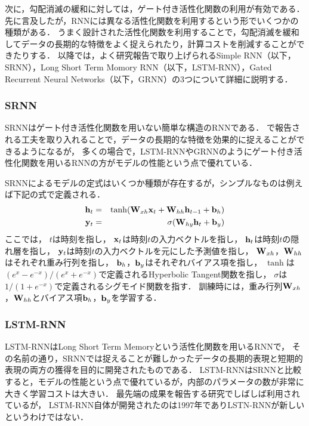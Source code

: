 次に，勾配消滅の緩和に対しては，ゲート付き活性化関数の利用が有効である．
先に言及したが，RNNには異なる活性化関数を利用するという形でいくつかの種類がある．
うまく設計された活性化関数を利用することで，勾配消滅を緩和してデータの長期的な特徴をよく捉えられたり，計算コストを削減することができたりする．
以降では，よく研究報告で取り上げられるSimple RNN（以下，SRNN）\cite{williams1989learning}，Long Short  Term Momory RNN（以下，LSTM-RNN）\cite{hochreiter1997long}，Gated Recurrent Neural Networks（以下，GRNN）\cite{cho2014learning}の3つについて詳細に説明する．



\subsubsection{SRNN}
SRNNはゲート付き活性化関数を用いない簡単な構造のRNNである．
\cite{le2015simple, krueger2015regularizing}で報告される工夫を取り入れることで，データの長期的な特徴を効果的に捉えることができるようになるが，
多くの場合で，LSTM-RNNやGRNNのようにゲート付き活性化関数を用いるRNNの方がモデルの性能という点で優れている．

SRNNによるモデルの定式はいくつか種類が存在するが，シンプルなものは例えば下記の式で定義される．
\begin{eqnarray}
\label{eq:srnn1}
{\bf h}_t &=& \tanh({\bf W}_{xh} {\bf x}_t + {\bf W}_{hh}  {\bf h}_{t-1} + {\bf b}_h)\\
\label{eq:srnn2}
{\bf y}_t &=& \sigma( {\bf W}_{hy} {\bf h}_t + {\bf b}_y)
\end{eqnarray}
ここでは，
$t$は時刻を指し，
${\bf x}_t$は時刻$t$の入力ベクトルを指し，
${\bf h}_t$は時刻$t$の隠れ層を指し，
${\bf y}_t$は時刻$t$の入力ベクトルを元にした予測値を指し，
${\bf W}_{xh}$，${\bf W}_{hh}$はそれぞれ重み行列を指し，
${\bf b}_h$，${\bf b}_y$はそれぞれバイアス項を指し，
$\tanh$は$( e^x - e^{-x} )/( e^x + e^{-x} )$で定義されるHyperbolic Tangent関数を指し，
$\sigma$は$1 / (1 + e^{-x})$で定義されるシグモイド関数を指す．
訓練時には，重み行列${\bf W}_{xh}$，${\bf W}_{hh}$とバイアス項${\bf b}_h$，${\bf b}_y$を学習する．


\subsubsection{LSTM-RNN}
LSTM-RNNはLong Short Term Memoryという活性化関数を用いるRNNで，
その名前の通り，SRNNでは捉えることが難しかったデータの長期的表現と短期的表現の両方の獲得を目的に開発されたものである\cite{hochreiter1997long}．
LSTM-RNNはSRNNと比較すると，モデルの性能という点で優れているが，内部のパラメータの数が非常に大きく学習コストは大きい．
最先端の成果を報告する研究でしばしば利用されているが，
LSTM-RNN自体が開発されたのは1997年でありLSTN-RNNが新しいというわけではない．


